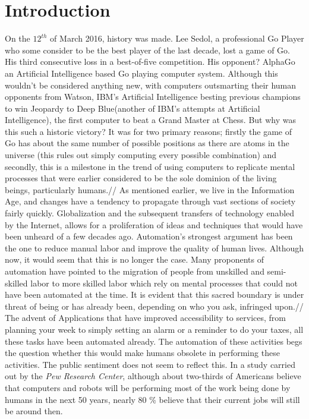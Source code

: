 \section{Introduction}
\label{sec:-intro}
	On the $12^{th}$ of March 2016, history was made. Lee Sedol, a professional Go Player who some consider to be the best player of the last decade, lost a game of Go. His third consecutive loss in a best-of-five competition. His opponent? AlphaGo an Artificial Intelligence based Go playing computer system\cite{alphagolee}. Although this wouldn't be considered anything new, with computers outsmarting their human opponents from Watson, IBM's Artificial Intelligence besting previous champions to win Jeopardy\cite{watsonjeopardy} to Deep Blue(another of IBM's attempts at Artificial Intelligence), the first computer to beat a Grand Master at Chess. But why was this such a historic victory? It was for two primary reasons; firstly the game of Go has about the same number of possible positions as there are atoms in the universe (this rules out simply computing every possible combination) and secondly, this is a milestone in the trend of using computers to replicate mental processes that were earlier considered to be the sole dominion of the living beings, particularly humans.//
	As mentioned earlier, we live in the Information Age, and changes have a tendency to propagate through vast sections of society fairly quickly. Globalization and the subsequent transfers of technology enabled by the Internet, allows for a proliferation of ideas and techniques that would have been unheard of a few decades ago. Automation's strongest argument has been the one to reduce manual labor and improve the quality of human lives. Although now, it would seem that this is no longer the case. Many proponents of automation have pointed to the migration of people from unskilled and semi-skilled labor to more skilled labor which rely on mental processes that could not have been automated at the time. It is evident that this sacred boundary is under threat of being or has already been, depending on who you ask, infringed upon.//
		The advent of Applications that have improved accessibility to services, from planning your week to simply setting an alarm or a reminder to do your taxes, all these tasks have been automated already. The automation of these activities begs the question whether this would make humans obsolete in performing these activities. The public sentiment does not seem to reflect this. In a study carried out by the \textit{Pew Research Center}\cite{workforcepew}, although about two-thirds of Americans believe that computers and robots will be performing most of the work being done by humans in the next 50 years, nearly 80 \% believe that their current jobs will still be around then.\\
